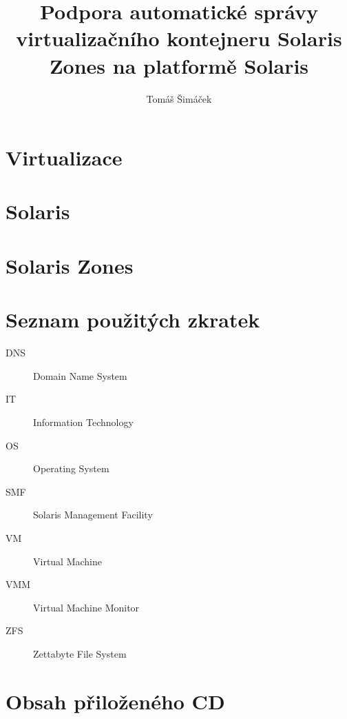 \documentclass[thesis=M,czech]{FITthesis}[2012/06/26]
\title{Podpora automatické správy virtualizačního kontejneru Solaris Zones na platformě Solaris}
\author{Tomáš Šimáček} %
\begin{document}

\begin{introduction}
  
\end{introduction}

\chapter{Virtualizace}
  
  
\chapter{Solaris}
  

\chapter{Solaris Zones}
  

\begin{conclusion}
  
\end{conclusion}




\appendix

\chapter{Seznam použitých zkratek}
\begin{description}
        \item[DNS] Domain Name System
	\item[IT] Information Technology
	\item[OS] Operating System
	\item[SMF] Solaris Management Facility
	\item[VM] Virtual Machine
	\item[VMM] Virtual Machine Monitor
	\item[ZFS] Zettabyte File System
\end{description}

\chapter{Obsah přiloženého CD}


\begin{figure}
\end{figure}
\end{document}
